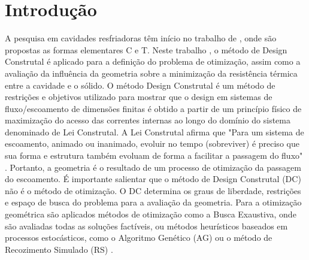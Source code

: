\documentclass[12pt,A4,A4pt]{article}
\begin{document}
\newpage
 \onehalfspacing
\section{Introdução}

 {\fontsize{12pt}{\baselineskip}\selectfont}
 
\hspace{0.5cm}A pesquisa em cavidades resfriadoras têm início no trabalho de \cite{Biserni2004}, onde são propostas as formas elementares C e T. Neste trabalho \citep{Biserni2004}, o método de Design Construtal é aplicado para a definição do problema de otimização, assim como a avaliação da influência da geometria sobre a minimização da resistência térmica entre a cavidade e o sólido. O método Design Construtal é um método de restrições e objetivos utilizado para mostrar que o design em sistemas de fluxo/escoamento de dimensões finitas é obtido a partir de um princípio físico de maximização do acesso das correntes internas ao longo do domínio do sistema denominado de Lei Construtal. A Lei Construtal afirma que "Para um sistema de escoamento, animado ou inanimado, evoluir no tempo (sobreviver) é preciso que sua forma e estrutura também evoluam de forma a facilitar a passagem do fluxo" \citep{Bejan}. Portanto, a geometria é o resultado de um processo de otimização da passagem do escoamento. É importante salientar que o método de Design Construtal (DC) não é o método de otimização. O DC determina os graus de liberdade, restrições e espaço de busca do problema para a avaliação da geometria. Para a otimização geométrica são aplicados métodos de otimização como a Busca Exaustiva, onde são avaliadas todas as soluções factíveis, ou métodos heurísticos baseados em processos estocásticos, como o Algoritmo Genético (AG) ou o método de Recozimento Simulado (RS) \citep{Lorenzini2014,Gonzales2015energy}.
\end{document}

